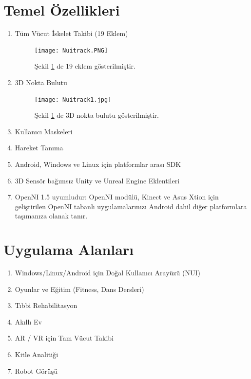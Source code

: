 \documentclass[12pt, a4paper]{article}
\begin{document}
	\section{Temel Özellikleri}
	\begin{enumerate}
		
		\item Tüm Vücut İskelet Takibi (19 Eklem)
		\begin{figure}[!ht]
			\caption{}
			\centering
			\texttt{[image: Nuitrack.PNG]}
			
			\label{dino1}
			Şekil \ref{dino1} de 19 eklem gösterilmiştir\cite{3DiVi}.	
		\end{figure}
		\newpage
		\item 3D Nokta Bulutu
		\begin{figure}[!ht]
			\caption{}
			\centering
			\texttt{[image: Nuitrack1.jpg]}
			
			\label{dino}
			Şekil \ref{dino1} de 3D nokta bulutu gösterilmiştir\cite{3dPointCloud}.	
		\end{figure}
		\item Kullanıcı Maskeleri
		\item Hareket Tanıma
		\item Android, Windows ve Linux için platformlar arası SDK
		\item 3D Sensör bağımsız Unity ve Unreal Engine Eklentileri
		\item OpenNI 1.5 uyumludur: OpenNI modülü, Kinect ve Asus Xtion için geliştirilen OpenNI tabanlı uygulamalarınızı Android dahil diğer platformlara taşımanıza olanak tanır\cite{3DiViBasic}.
		
	\end{enumerate}
	
	
	
	
	\section{Uygulama Alanları}
	\begin{enumerate}
		\item Windows/Linux/Android için Doğal Kullanıcı Arayüzü (NUI)
		\item Oyunlar ve Eğitim (Fitness, Dans Dersleri)
		\item Tıbbi Rehabilitasyon
		\item Akıllı Ev
		\item AR / VR için Tam Vücut Takibi
		\item Kitle Analitiği
		\item Robot Görüşü
		
		\cite{3DiViBasic}
		
	\end{enumerate}
	
\end{document}
